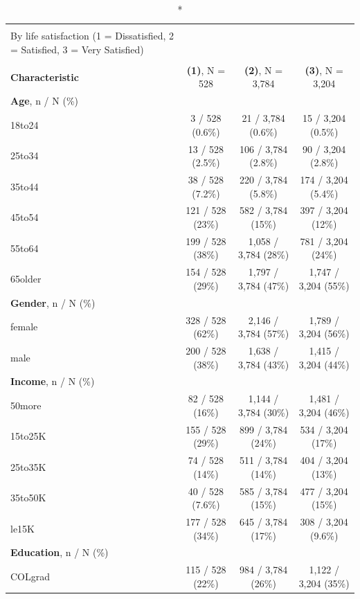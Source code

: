 \documentclass[11pt,a4paper,oldfontcommands]{memoir}
\begin{document}
{\begin{footnotesize}
\captionsetup[table]{labelformat=empty,skip=1pt}
\begin{longtable}{lccc}
\caption*{
\large Descriptive Statistics \label{tab:descriptive1} \\ 
\small By life satisfaction (1 = Dissatisfied, 2 = Satisfied, 3 = Very Satisfied) \\ 
} \\ 
\toprule
\textbf{Characteristic} & \textbf{(1)}, N = 528 & \textbf{(2)}, N = 3,784 & \textbf{(3)}, N = 3,204 \\ 
\midrule
\textbf{Age}, n / N (\%) &  &  &  \\ 
\quad 18to24 & 3 / 528 (0.6\%) & 21 / 3,784 (0.6\%) & 15 / 3,204 (0.5\%) \\ 
\quad 25to34 & 13 / 528 (2.5\%) & 106 / 3,784 (2.8\%) & 90 / 3,204 (2.8\%) \\ 
\quad 35to44 & 38 / 528 (7.2\%) & 220 / 3,784 (5.8\%) & 174 / 3,204 (5.4\%) \\ 
\quad 45to54 & 121 / 528 (23\%) & 582 / 3,784 (15\%) & 397 / 3,204 (12\%) \\ 
\quad 55to64 & 199 / 528 (38\%) & 1,058 / 3,784 (28\%) & 781 / 3,204 (24\%) \\ 
\quad 65older & 154 / 528 (29\%) & 1,797 / 3,784 (47\%) & 1,747 / 3,204 (55\%) \\ 
\textbf{Gender}, n / N (\%) &  &  &  \\ 
\quad female & 328 / 528 (62\%) & 2,146 / 3,784 (57\%) & 1,789 / 3,204 (56\%) \\ 
\quad male & 200 / 528 (38\%) & 1,638 / 3,784 (43\%) & 1,415 / 3,204 (44\%) \\ 
\textbf{Income}, n / N (\%) &  &  &  \\ 
\quad 50more & 82 / 528 (16\%) & 1,144 / 3,784 (30\%) & 1,481 / 3,204 (46\%) \\ 
\quad 15to25K & 155 / 528 (29\%) & 899 / 3,784 (24\%) & 534 / 3,204 (17\%) \\ 
\quad 25to35K & 74 / 528 (14\%) & 511 / 3,784 (14\%) & 404 / 3,204 (13\%) \\ 
\quad 35to50K & 40 / 528 (7.6\%) & 585 / 3,784 (15\%) & 477 / 3,204 (15\%) \\ 
\quad le15K & 177 / 528 (34\%) & 645 / 3,784 (17\%) & 308 / 3,204 (9.6\%) \\ 
\textbf{Education}, n / N (\%) &  &  &  \\ 
\quad COLgrad & 115 / 528 (22\%) & 984 / 3,784 (26\%) & 1,122 / 3,204 (35\%) \\ 

\end{longtable}
\end{footnotesize}}
\end{document}
